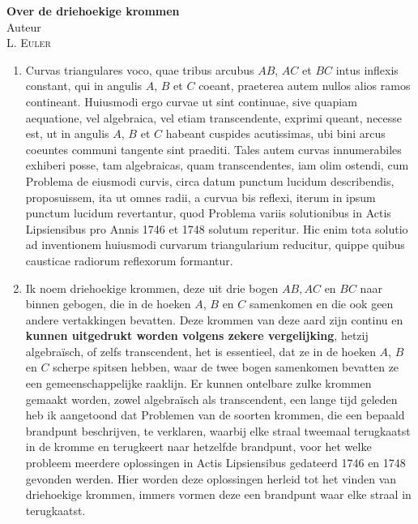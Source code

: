 \documentclass[10pt,a4paper]{article}
\newcommand{\switchenum}{\setcounter{enumi}{\arabic{enumi}-1}\switchcolumn}
\begin{document}
\begin{paracol}{2}
\begin{center}
		\par {\bf Over de driehoekige krommen}\\
		Auteur\\
		\textsc{L. Euler}
	\end{center}
	\switchcolumn*

	\par \begin{enumerate}[topsep=1px]
		\item Curvas triangulares voco, quae tribus arcubus $AB$, $AC$ et $BC$ intus inflexis constant, qui in angulis $A$, $B$ et $C$ coeant, praeterea autem nullos alios ramos contineant. Huiusmodi ergo curvae ut sint continuae, sive quapiam aequatione, vel algebraica, vel etiam transcendente, exprimi queant, necesse est, ut in angulis $A$, $B$ et $C$ habeant cuspides acutissimas, ubi bini arcus coeuntes communi tangente sint praediti. Tales autem curvas innumerabiles exhiberi posse, tam algebraicas, quam transcendentes, iam olim ostendi, cum Problema de eiusmodi curvis, circa datum punctum lucidum describendis, proposuissem, ita ut omnes radii, a curvua bis reflexi, iterum in ipsum punctum lucidum revertantur, quod Problema variis solutionibus in Actis Lipsiensibus pro Annis 1746 et 1748 solutum reperitur. Hic enim tota solutio ad inventionem huiusmodi curvarum triangularium reducitur, quippe quibus causticae radiorum reflexorum formantur. 
			
		\switchenum
		\item Ik noem driehoekige krommen, deze uit drie bogen $AB, AC$ en $BC$ naar binnen gebogen, die in de hoeken $A$, $B$ en $C$ samenkomen en die ook geen andere vertakkingen bevatten. Deze krommen van deze aard zijn continu en \textbf{kunnen uitgedrukt worden volgens zekere vergelijking}, hetzij algebraïsch, of zelfs transcendent, het is essentieel, dat ze in de hoeken $A$, $B$ en $C$ scherpe spitsen hebben, waar de twee bogen samenkomen bevatten ze een gemeenschappelijke raaklijn. Er kunnen ontelbare zulke krommen gemaakt worden, zowel algebraïsch als transcendent, een lange tijd geleden heb ik aangetoond dat Problemen van de soorten krommen, die een bepaald brandpunt beschrijven, te verklaren, waarbij elke straal tweemaal terugkaatst in de kromme en terugkeert naar hetzelfde brandpunt, voor het welke probleem meerdere oplossingen in Actis Lipsiensibus gedateerd 1746 en 1748 gevonden werden. Hier worden deze oplossingen herleid tot het vinden van driehoekige krommen, immers vormen deze een brandpunt waar elke straal in terugkaatst. 
		

\end{enumerate}
\end{paracol}
\end{document}
